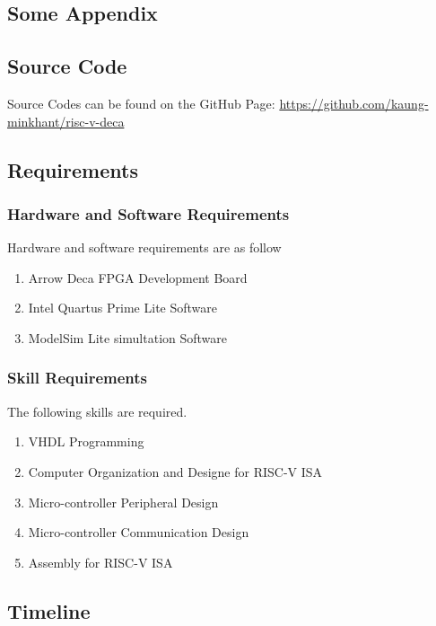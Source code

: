 \begin{appendices}

	\chapter{Some Appendix}

	\section{Source Code}
	\label{appendix:source}
	Source Codes can be found on the GitHub Page: \url{https://github.com/kaung-minkhant/risc-v-deca}

	\section{Requirements}
	\subsection{Hardware and Software Requirements}
	Hardware and software requirements are as follow
	\begin{enumerate}
		\item Arrow Deca FPGA Development Board
		\item Intel Quartus Prime Lite Software
		\item ModelSim Lite simultation Software
	\end{enumerate}
	\subsection{Skill Requirements}
	The following skills are required.
	\begin{enumerate}
		\item VHDL Programming
		\item Computer Organization and Designe for RISC-V ISA
		\item Micro-controller Peripheral Design
		\item Micro-controller Communication Design
		\item Assembly for RISC-V ISA
	\end{enumerate}

	\newpage

	\section{Timeline}


\end{appendices}
